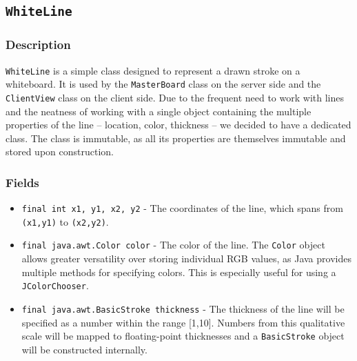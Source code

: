 \subsection{\texttt{WhiteLine}}

\subsubsection{Description}
\texttt{WhiteLine} is a simple class designed to represent a drawn stroke on a whiteboard. It is used by the \texttt{MasterBoard} class on the server side and the \texttt{ClientView} class on the client side. Due to the frequent need to work with lines and the neatness of working with a single object containing the multiple properties of the line -- location, color, thickness -- we decided to have a dedicated class. The class is immutable, as all its properties are themselves immutable and stored upon construction.

\subsubsection{Fields}
\begin{itemize}
\item \texttt{final int x1, y1, x2, y2} - The coordinates of the line, which spans from \texttt{(x1,y1)} to \texttt{(x2,y2)}.
\item \texttt{final java.awt.Color color} - The color of the line. The \texttt{Color} object allows greater versatility over storing individual RGB values, as Java provides multiple methods for specifying colors. This is especially useful for using a \texttt{JColorChooser}.
\item \texttt{final java.awt.BasicStroke thickness} - The thickness of the line will be specified as a number within the range [1,10]. Numbers from this qualitative scale will be mapped to floating-point thicknesses and a \texttt{BasicStroke} object will be constructed internally.
\end{itemize}

